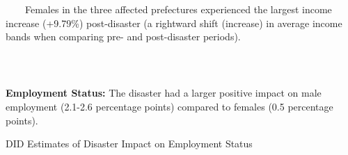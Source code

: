 \documentclass[serif, aspectratio=169]{beamer}
\newcommand{\incomebandlinks}{%
    \vfill %
    \hfill %
    {\small %
        \hyperlink{income_band}{\beamerbutton{Reference}} \,

    }
}
\begin{document}
\begin{frame}[label=income_band_main]
    \begin{column}{0.49\textwidth}
            \raggedright
    
    \vspace{-2.5cm}
    \hspace{-1.1cm}
\large {\qquad \ \ \ \ Females in the three affected prefectures experienced the largest income increase (+9.79\%) post-disaster (a rightward shift (increase) in average income bands when comparing pre- and post-disaster periods).}
    \end{column}
\vspace{-0.7cm}
\incomebandlinks
\end{frame}

\begin{frame}[label=employed]




\textbf{Employment Status:} The disaster had a larger positive impact on male employment (2.1-2.6 percentage points) compared to females (0.5 percentage points).

\begin{table}[htbp]
\centering
\caption{DID Estimates of Disaster Impact on Employment Status}

\vspace{-0.2cm}



\end{table}
\end{frame}
\end{document}

